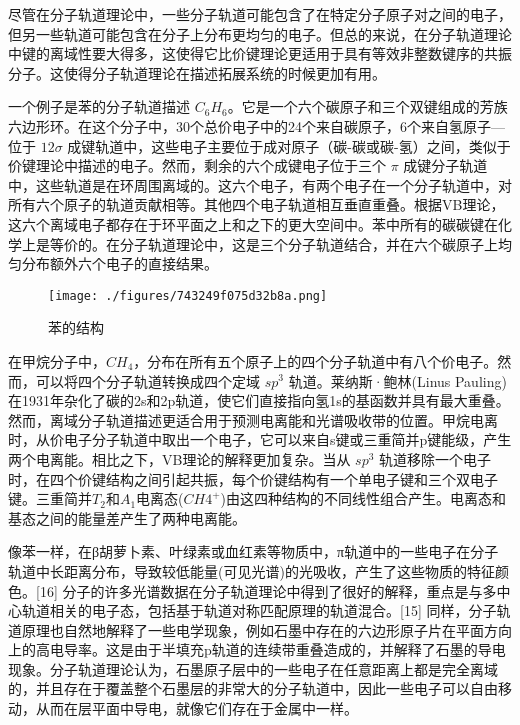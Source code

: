 尽管在分子轨道理论中，一些分子轨道可能包含了在特定分子原子对之间的电子，但另一些轨道可能包含在分子上分布更均匀的电子。但总的来说，在分子轨道理论中键的离域性要大得多，这使得它比价键理论更适用于具有等效非整数键序的共振分子。这使得分子轨道理论在描述拓展系统的时候更加有用。

一个例子是苯的分子轨道描述 $C_6H_6$。它是一个六个碳原子和三个双键组成的芳族六边形环。在这个分子中，30个总价电子中的24个来自碳原子，6个来自氢原子—位于 $12\sigma$ 成键轨道中，这些电子主要位于成对原子（碳-碳或碳-氢）之间，类似于价键理论中描述的电子。然而，剩余的六个成键电子位于三个 $\pi$ 成键分子轨道中，这些轨道是在环周围离域的。这六个电子，有两个电子在一个分子轨道中，对所有六个原子的轨道贡献相等。其他四个电子轨道相互垂直重叠。根据VB理论，这六个离域电子都存在于环平面之上和之下的更大空间中。苯中所有的碳碳键在化学上是等价的。在分子轨道理论中，这是三个分子轨道结合，并在六个碳原子上均匀分布额外六个电子的直接结果。

\begin{figure}[ht]
\centering
\texttt{[image: ./figures/743249f075d32b8a.png]}
\caption{苯的结构} \label{fig_MOFa_2}
\end{figure}

在甲烷分子中，$CH_4$，分布在所有五个原子上的四个分子轨道中有八个价电子。然而，可以将四个分子轨道转换成四个定域 $sp^3$ 轨道。莱纳斯·鲍林(Linus Pauling)在1931年杂化了碳的2s和2p轨道，使它们直接指向氢1s的基函数并具有最大重叠。然而，离域分子轨道描述更适合用于预测电离能和光谱吸收带的位置。甲烷电离时，从价电子分子轨道中取出一个电子，它可以来自s键或三重简并p键能级，产生两个电离能。相比之下，VB理论的解释更加复杂。当从 $sp^3$ 轨道移除一个电子时，在四个价键结构之间引起共振，每个价键结构有一个单电子键和三个双电子键。三重简并$T_2$和$A_1$电离态($CH4^+$)由这四种结构的不同线性组合产生。电离态和基态之间的能量差产生了两种电离能。

像苯一样，在β胡萝卜素、叶绿素或血红素等物质中，π轨道中的一些电子在分子轨道中长距离分布，导致较低能量(可见光谱)的光吸收，产生了这些物质的特征颜色。[16] 分子的许多光谱数据在分子轨道理论中得到了很好的解释，重点是与多中心轨道相关的电子态，包括基于轨道对称匹配原理的轨道混合。[15] 同样，分子轨道原理也自然地解释了一些电学现象，例如石墨中存在的六边形原子片在平面方向上的高电导率。这是由于半填充p轨道的连续带重叠造成的，并解释了石墨的导电现象。分子轨道理论认为，石墨原子层中的一些电子在任意距离上都是完全离域的，并且存在于覆盖整个石墨层的非常大的分子轨道中，因此一些电子可以自由移动，从而在层平面中导电，就像它们存在于金属中一样。
